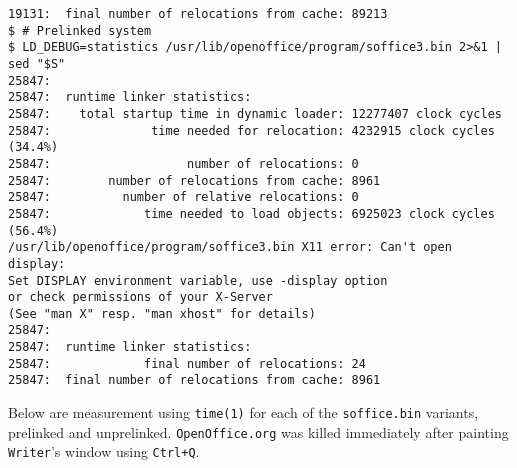 \documentclass[twoside]{article}
\def\tts#1{\texttt{\small #1}}
\begin{document}
{{\begin{verbatim}
19131:  final number of relocations from cache: 89213
$ # Prelinked system
$ LD_DEBUG=statistics /usr/lib/openoffice/program/soffice3.bin 2>&1 | sed "$S"
25847:
25847:  runtime linker statistics:
25847:    total startup time in dynamic loader: 12277407 clock cycles
25847:              time needed for relocation: 4232915 clock cycles (34.4%)
25847:                   number of relocations: 0
25847:        number of relocations from cache: 8961
25847:          number of relative relocations: 0
25847:             time needed to load objects: 6925023 clock cycles (56.4%)
/usr/lib/openoffice/program/soffice3.bin X11 error: Can't open display:
Set DISPLAY environment variable, use -display option
or check permissions of your X-Server
(See "man X" resp. "man xhost" for details)
25847:
25847:  runtime linker statistics:
25847:             final number of relocations: 24
25847:  final number of relocations from cache: 8961
\end{verbatim}}
}

Below are measurement using \tts{time(1)} for each of the \tts{soffice.bin}
variants, prelinked and unprelinked.  \tts{OpenOffice.org} was killed
immediately after painting \tts{Writer}'s window using \tts{Ctrl+Q}.
\end{document}

